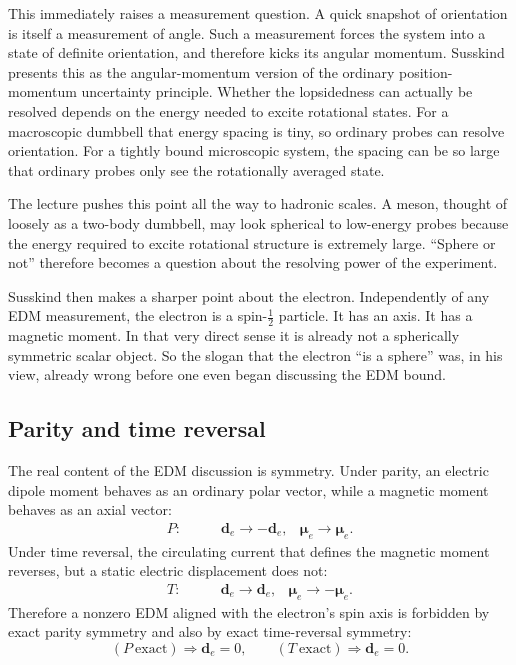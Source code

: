 This immediately raises a measurement question. A quick snapshot of orientation is itself a measurement of angle. Such a measurement forces the system into a state of definite orientation, and therefore kicks its angular momentum. Susskind presents this as the angular-momentum version of the ordinary position-momentum uncertainty principle. Whether the lopsidedness can actually be resolved depends on the energy needed to excite rotational states. For a macroscopic dumbbell that energy spacing is tiny, so ordinary probes can resolve orientation. For a tightly bound microscopic system, the spacing can be so large that ordinary probes only see the rotationally averaged state.

The lecture pushes this point all the way to hadronic scales. A meson, thought of loosely as a two-body dumbbell, may look spherical to low-energy probes because the energy required to excite rotational structure is extremely large. ``Sphere or not'' therefore becomes a question about the resolving power of the experiment.

Susskind then makes a sharper point about the electron. Independently of any EDM measurement, the electron is a spin-\(\tfrac12\) particle. It has an axis. It has a magnetic moment. In that very direct sense it is already not a spherically symmetric scalar object. So the slogan that the electron ``is a sphere'' was, in his view, already wrong before one even began discussing the EDM bound.

\subsection{Parity and time reversal}

The real content of the EDM discussion is symmetry. Under parity, an electric dipole moment behaves as an ordinary polar vector, while a magnetic moment behaves as an axial vector:
\begin{align}
P:\qquad &\mathbf d_e \to -\mathbf d_e,
&\boldsymbol{\mu}_e \to \boldsymbol{\mu}_e .
\end{align}
Under time reversal, the circulating current that defines the magnetic moment reverses, but a static electric displacement does not:
\begin{align}
T:\qquad &\mathbf d_e \to \mathbf d_e,
&\boldsymbol{\mu}_e \to -\boldsymbol{\mu}_e .
\end{align}
Therefore a nonzero EDM aligned with the electron's spin axis is forbidden by exact parity symmetry and also by exact time-reversal symmetry:
\begin{equation}
(P\ \text{exact}) \Rightarrow \mathbf d_e=0,
\qquad
(T\ \text{exact}) \Rightarrow \mathbf d_e=0.
\end{equation}

